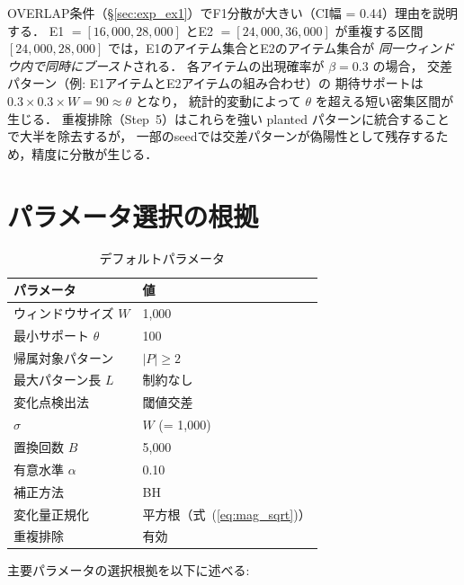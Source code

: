 OVERLAP条件（§\ref{sec:exp_ex1}）でF1分散が大きい（CI幅 = 0.44）理由を説明する．
E1 $= [16{,}000, 28{,}000]$ とE2 $= [24{,}000, 36{,}000]$ が重複する区間
$[24{,}000, 28{,}000]$ では，E1のアイテム集合とE2のアイテム集合が
\emph{同一ウィンドウ内で同時にブースト}される．
各アイテムの出現確率が $\beta = 0.3$ の場合，
交差パターン（例: E1アイテムとE2アイテムの組み合わせ）の
期待サポートは $0.3 \times 0.3 \times W = 90 \approx \theta$  となり，
統計的変動によって $\theta$ を超える短い密集区間が生じる．
重複排除（Step~5）はこれらを強い planted パターンに統合することで大半を除去するが，
一部のseedでは交差パターンが偽陽性として残存するため，精度に分散が生じる．

\section{パラメータ選択の根拠}\label{app:params}

\begin{table}[h]
\caption{デフォルトパラメータ}
\label{tab:default_params}
\centering
\begin{tabular}{ll}
\toprule
パラメータ & 値 \\
\midrule
ウィンドウサイズ $W$ & 1{,}000 \\
最小サポート $\theta$ & 100 \\
帰属対象パターン & $|P| \geq 2$ \\
最大パターン長 $L$ & 制約なし\footnotemark[1] \\
変化点検出法 & 閾値交差 \\
$\sigma$ & $W$ (= 1{,}000) \\
置換回数 $B$ & 5{,}000 \\
有意水準 $\alpha$ & 0.10 \\
補正方法 & BH \\
変化量正規化 & 平方根（式~(\ref{eq:mag_sqrt})） \\
重複排除 & 有効 \\
\bottomrule
\end{tabular}
\end{table}


主要パラメータの選択根拠を以下に述べる:

